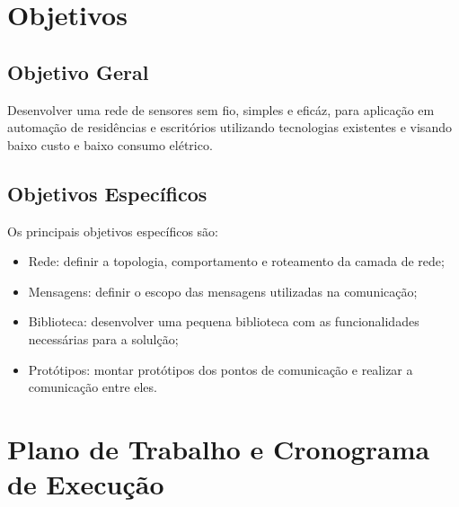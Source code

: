 \documentclass[
    12pt,               %
    a4paper,            %
    english,            %
    brazil,             %
    ]{article}
\begin{document}
\section{Objetivos}


	\subsection{Objetivo Geral}

	Desenvolver uma rede de sensores sem fio, simples e eficáz, para aplicação em automação de residências e escritórios
	utilizando tecnologias existentes e visando baixo custo e baixo consumo elétrico.

	\subsection{Objetivos Específicos}

	Os principais objetivos específicos são:

	\begin{itemize}
		\item Rede: definir a topologia, comportamento e roteamento da camada de rede;
		\item Mensagens: definir o escopo das mensagens utilizadas na comunicação;
		\item Biblioteca: desenvolver uma pequena biblioteca com as funcionalidades necessárias para a solulção;
		\item Protótipos: montar protótipos dos pontos de comunicação e realizar a comunicação entre eles.
	\end{itemize}


\section{Plano de Trabalho e Cronograma de Execução}
\end{document}
